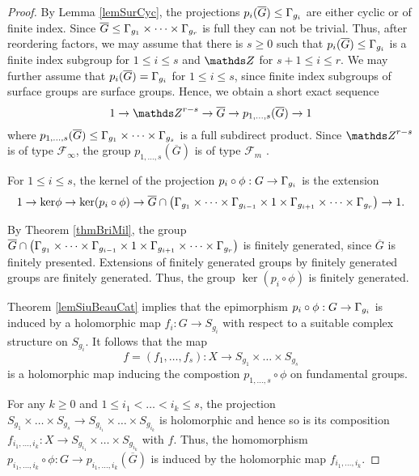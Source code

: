 \begin{proof}
 By Lemma \ref{lemSurCyc}, the projections $p_i(\overline{G})\leq \Gamma_{g_i}$ are either cyclic or of finite index. Since $\overline{G}\leq \Gamma_{g_1}\times \dots \times \Gamma_{g_r}$ is full they can not be trivial. Thus, after reordering factors, we may assume that there is $s\geq 0$ such that $p_i(\overline{G})\leq \Gamma_{g_i}$ is a finite index subgroup for $1\leq i \leq s$ and $\ZZ$ for $s+1\leq i \leq r$. We may further assume that $p_i(\overline{G})=\Gamma_{g_i}$ for $1\leq i \leq s$, since finite index subgroups of surface groups are surface groups. Hence, we obtain a short exact sequence 
 \[
  1 \rightarrow \ZZ^{r-s}\rightarrow \overline{G} \rightarrow p_{1,\dots,s}(\overline{G})\rightarrow 1
 \] 
where $p_{1,\dots,s}(\overline{G})\leq \Gamma_{g_1}\times \dots \times \Gamma_{g_s}$ is a full subdirect product. Since $\ZZ^{r-s}$ is of type $\mathcal{F}_{\infty}$, the group $p_{1,\dots,s}(\overline{G})$ is of type $\mathcal{F}_m$ \cite[Proposition 2.7]{Bie-81}.

For $1\leq i \leq s$, the kernel of the projection $p_i\circ\phi: G\rightarrow \Gamma_{g_i}$ is the extension
\[
 1 \rightarrow {\rm{ker}} \phi \rightarrow {\rm{ker}}(p_i\circ \phi)\rightarrow \overline{G}\cap \left(\Gamma_{g_1}\times \dots \times \Gamma_{g_{i-1}}\times 1 \times\Gamma_{g_{i+1}}\times \dots \times \Gamma_{g_r}\right)\rightarrow 1.
\]

By Theorem \ref{thmBriMil}, the group $\overline{G}\cap \left(\Gamma_{g_1}\times \dots \times \Gamma_{g_{i-1}}\times 1 \times\Gamma_{g_{i+1}}\times \dots \times \Gamma_{g_r}\right)$ is finitely generated, since $\overline{G}$ is finitely presented. Extensions of finitely generated groups by finitely generated groups are finitely generated. Thus, the group $\ker(p_i\circ \phi)$ is finitely generated.

Theorem \ref{lemSiuBeauCat} implies that the epimorphism $p_i\circ \phi: G\rightarrow \Gamma_{g_i}$ is induced by a holomorphic map $f_i: G\rightarrow S_{g_i}$ with respect to a suitable complex structure on $S_{g_i}$. It follows that the map
\[
f=(f_1,\dots,f_s): X\rightarrow S_{g_1}\times \dots \times S_{g_s}
\] 
is a holomorphic map inducing the compostion $p_{1,\dots,s}\circ \phi$ on fundamental groups.

For any $k\geq 0$ and $1\leq i_1< \dots < i_k\leq s$, the projection $S_{g_1}\times \dots \times S_{g_s}\rightarrow S_{g_{i_1}}\times \dots \times S_{g_{i_k}}$ is holomorphic and hence so is its composition $f_{i_1,\dots,i_k}:X\rightarrow S_{g_{i_1}}\times \dots\times S_{g_{i_k}}$ with $f$. Thus, the homomorphism $p_{i_1,\dots,i_k}\circ \phi: G\rightarrow p_{i_1,\dots,i_k}(\overline{G})$ is induced by the holomorphic map $f_{i_1,\dots,i_k}$.
 

\end{proof}
